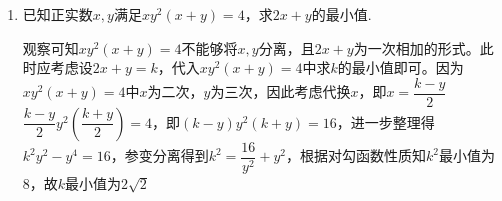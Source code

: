 \begin{enumerate}
    \begin{enumerate}
        \item 当$a = 1, c = \dfrac{1}{2}$时，求出不等式$f(x) < 0$的解
        \item 求出不等式$f(x) < 0$的解（用$a, c$表示）
        \item 若以二次函数的图象与坐标轴的三个交点为顶点的三角形面积为8，求$a$的取值范围
        \item 若不等式$m^2-2km+1+b+ac \geq 0$对所有$k \in [-1, 1]$恒成立，求$m$的取值范围。
    \end{enumerate}
    \begin{jieda}
        \begin{enumerate}
            \item 当$a = 1, c = \dfrac{1}{2}$时，$f(x) = x^2 + bx + \dfrac{1}{2}$，因为过$(\dfrac{1}{2}, 0)$，所以$b = -\dfrac{3}{2}$，因此有$f(1) = 0$，因此$f(x) < 0$的解集为$(\dfrac{1}{2}, 1)$
            \item 根据韦达定理可知$f(\dfrac{1}{a}) = f(c) = 0$，因为当$0 < x < c$时，恒有$f(x) > 0$，所以必有$\dfrac{1}{a} > c$，因此$f(x) < 0$的解集为$(c, \dfrac{1}{a})$
            \item 根据题意可知该三角形面积为$S = \dfrac{1}{2}(\dfrac{1}{a} - c) \times c = 8$，故$\dfrac{1}{a} = c + \dfrac{16}{c} \in [8, +\infty)$，因此$a \in (0, \dfrac{1}{8}]$
            \item 根据$f(c) = 0$可知$1+b+ac = 0$，因此不等式变为$m^2-2km \geq 0$，设$g(k) = m^2-2km$，故应有$g(-1) \geq 0, g(1) \geq 0$，即$m^2-2m \geq 0, m^2 + 2m \geq 0$，解得$m \in (-\infty, -2] \cup [2, +\infty) \cup \{0\}$
        \end{enumerate}
    \end{jieda}    
    \begin{vspace_}
    \vsp[9]
    \end{vspace_}
    \item 已知正实数$x, y$满足$xy^2(x+y) = 4$，求$2x+y$的最小值.
    \begin{jieda}
        观察可知$xy^2(x+y) = 4$不能够将$x, y$分离，且$2x+y$为一次相加的形式。此时应考虑设$2x+y = k$，代入$xy^2(x+y) = 4$中求$k$的最小值即可。因为$xy^2(x+y) = 4$中$x$为二次，$y$为三次，因此考虑代换$x$，即$x = \dfrac{k-y}{2}$ \\
        $\dfrac{k-y}{2}y^2(\dfrac{k+y}{2}) = 4$，即$(k-y)y^2(k+y) = 16$，进一步整理得$k^2y^2 - y^4 = 16$，参变分离得到$k^2 = \dfrac{16}{y^2} + y^2$，根据对勾函数性质知$k^2$最小值为8，故$k$最小值为$2\sqrt{2}$
    \end{jieda}
    \begin{vspace_}
    \vsp[9]
    \end{vspace_}
\end{enumerate}